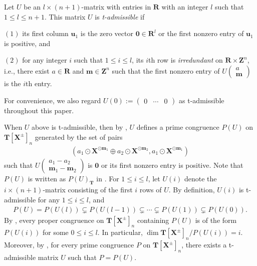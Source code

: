 \documentclass[a4paper,12pt]{amsart}
\theoremstyle{plain}
\theoremstyle{definition}
\begin{document}
Let $U$ be an $l \times (n + 1)$-matrix with entries in $\boldsymbol{R}$ with an integer $l$ such that $1 \le l \le n + 1$.
This matrix $U$ is \textit{t-admissible} if

$(1)$ its first column $\boldsymbol{u}_1$ is the zero vector $\boldsymbol{0} \in \boldsymbol{R}^l$ or the first nonzero entry of $\boldsymbol{u}_1$ is positive, and 

$(2)$ for any integer $i$ such that $1 \le i \le l$, its $i$th row is \textit{irredundant} on $\boldsymbol{R} \times \boldsymbol{Z}^n$, i.e., there exist $a \in \boldsymbol{R}$ and $\boldsymbol{m} \in \boldsymbol{Z}^n$ such that the first nonzero entry of $U \begin{pmatrix} a \\ \boldsymbol{m} \end{pmatrix}$ is the $i$th entry.

For convenience, we also regard $U(0) := \begin{pmatrix} 0 & \cdots  & 0\end{pmatrix}$ as t-admissible throughout this paper.

When $U$ above is t-admissible, then by \cite[Proposition~2.10(ii)]{Joo=Mincheva}, $U$ defines a prime congruence $P(U)$ on $\boldsymbol{T}[\boldsymbol{X}^{\pm}]_n$ generated by the set of pairs
\begin{align*}
\left(a_1 \odot \boldsymbol{X}^{\odot \boldsymbol{m}_1} \oplus a_2 \odot \boldsymbol{X}^{\odot \boldsymbol{m}_2}, a_1 \odot \boldsymbol{X}^{\odot \boldsymbol{m}_1} \right)
\end{align*}
such that $U \begin{pmatrix} a_1 - a_2 \\ \boldsymbol{m}_1 - \boldsymbol{m}_2 \end{pmatrix}$ is $\boldsymbol{0}$ or its first nonzero entry is positive.
Note that $P(U)$ is written as $P(U)_{\boldsymbol{T}}$ in \cite{Joo=Mincheva}.
For $1 \le i \le l$, let $U(i)$ denote the $i \times (n + 1)$-matrix consisting of the first $i$ rows of $U$.
By definition, $U(i)$ is t-admissible for any $1 \le i \le l$, and
\begin{align*}
    P(U) = P(U(l)) \subsetneq P(U(l - 1)) \subsetneq \cdots \subsetneq P(U(1)) \subsetneq P(U(0)).
\end{align*}
By \cite[Theorem~4.13(iii)]{Joo=Mincheva}, every proper congruence on $\boldsymbol{T}[\boldsymbol{X}^{\pm}]_n$ containing $P(U)$ is of the form $P(U(i))$ for some $0 \le i \le l$.
In particular, $\operatorname{dim}\boldsymbol{T}[\boldsymbol{X}^{\pm}]_n / P(U(i)) = i$.
Moreover, by \cite[Theorem~4.14(i)]{Joo=Mincheva}, for every prime congruence $P$ on $\boldsymbol{T}[\boldsymbol{X}^{\pm}]_n$, there exists a t-admissible matrix $U$ such that $P = P(U)$.
\end{document}
